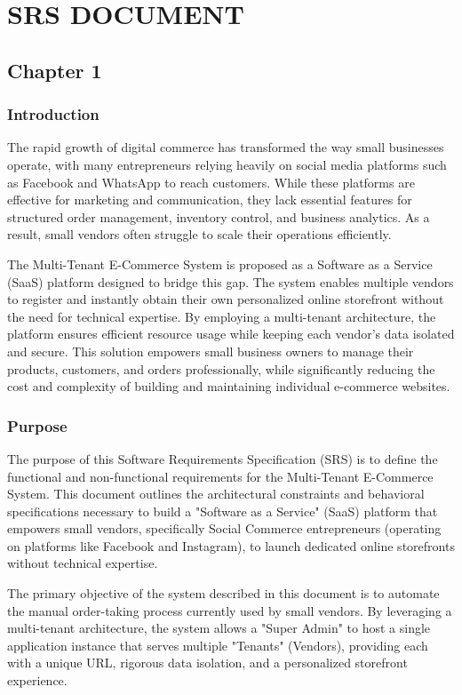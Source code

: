\chapter{SRS DOCUMENT} \label{ch:procedure}
\section{Chapter 1}

\subsection*{Introduction}

The rapid growth of digital commerce has transformed the way small businesses operate, with many entrepreneurs relying heavily on social media platforms such as Facebook and WhatsApp to reach customers. While these platforms are effective for marketing and communication, they lack essential features for structured order management, inventory control, and business analytics. As a result, small vendors often struggle to scale their operations efficiently.

The Multi-Tenant E-Commerce System is proposed as a Software as a Service (SaaS) platform designed to bridge this gap. The system enables multiple vendors to register and instantly obtain their own personalized online storefront without the need for technical expertise. By employing a multi-tenant architecture, the platform ensures efficient resource usage while keeping each vendor’s data isolated and secure. This solution empowers small business owners to manage their products, customers, and orders professionally, while significantly reducing the cost and complexity of building and maintaining individual e-commerce websites.

\subsection{Purpose}
The purpose of this Software Requirements Specification (SRS) is to define the functional and non-functional requirements for the Multi-Tenant E-Commerce System. This document outlines the architectural constraints and behavioral specifications necessary to build a "Software as a Service" (SaaS) platform that empowers small vendors, specifically Social Commerce entrepreneurs (operating on platforms like Facebook and Instagram), to launch dedicated online storefronts without technical expertise.

The primary objective of the system described in this document is to automate the manual order-taking process currently used by small vendors. By leveraging a multi-tenant architecture, the system allows a "Super Admin" to host a single application instance that serves multiple "Tenants" (Vendors), providing each with a unique URL, rigorous data isolation, and a personalized storefront experience.

